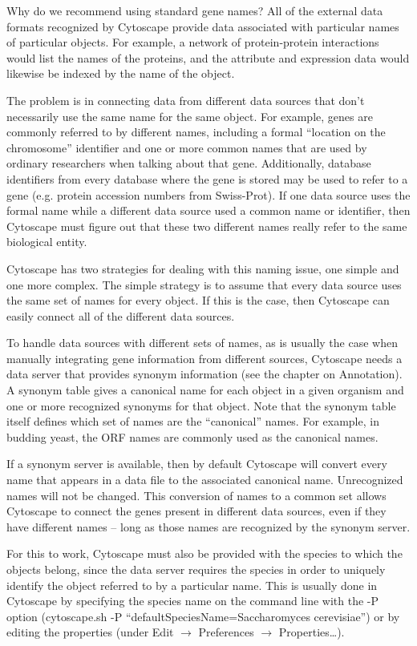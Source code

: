  Why do we recommend using standard gene names? All of the external data
formats recognized by Cytoscape provide data associated with particular names
of particular objects. For example, a network of protein-protein interactions
would list the names of the proteins, and the attribute and expression data
would likewise be indexed by the name of the object. 

 The problem is in connecting data from different data sources that don't
necessarily use the same name for the same object. For example, genes are
commonly referred to by different names, including a formal ``location on the
chromosome'' identifier and one or more common names that are used by ordinary
researchers when talking about that gene. Additionally, database identifiers
from every database where the gene is stored may be used to refer to a gene
(e.g. protein accession numbers from Swiss-Prot). If one data source uses the
formal name while a different data source used a common name or identifier,
then Cytoscape must figure out that these two different names really refer to
the same biological entity. 

 Cytoscape has two strategies for dealing with this naming issue, one simple
and one more complex. The simple strategy is to assume that every data source
uses the same set of names for every object. If this is the case, then
Cytoscape can easily connect all of the different data sources. 

 To handle data sources with different sets of names, as is usually the case
when manually integrating gene information from different sources, Cytoscape
needs a data server that provides synonym information (see the chapter on
Annotation). A synonym table gives a canonical name for each object in a given
organism and one or more recognized synonyms for that object. Note that the
synonym table itself defines which set of names are the ``canonical'' names.
For example, in budding yeast, the ORF names are commonly used as the canonical
names. 

 If a synonym server is available, then by default Cytoscape will convert every
name that appears in a data file to the associated canonical name. Unrecognized
names will not be changed. This conversion of names to a common set allows
Cytoscape to connect the genes present in different data sources, even if they
have different names -- long as those names are recognized by the
synonym server. 

 For this to work, Cytoscape must also be provided with the species to which
the objects belong, since the data server requires the species in order to
uniquely identify the object referred to by a particular name. This is usually
done in Cytoscape by specifying the species name on the command line with the
-P option (cytoscape.sh -P ``defaultSpeciesName=Saccharomyces
cerevisiae'') or by editing the properties (under Edit $\rightarrow$ Preferences
$\rightarrow$ Properties\ldots). 

